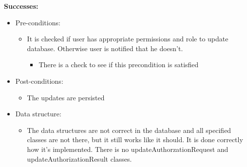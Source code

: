 \textbf{Successes:}
\begin{itemize}

	
\item Pre-conditions:
	\begin{itemize}
		\item It is checked if user has appropriate permissions and role to update database. Otherwise user is notified that he doesn't.
			\begin{itemize}
					\item There is a check to see if this precondition is satisfied
			\end{itemize}
	\end{itemize}
		
	\item Post-conditions:
		\begin{itemize}
			\item The updates are persisted
		\end{itemize}
		
	\item Data structure:
		\begin{itemize}
			\item The data structures are not correct in the database and all specified classes are not there, but it still works like it should. It is done correctly how it's implemented. There is no updateAuthorzationRequest and updateAuthorizationResult classes. 
		\end{itemize}
\end{itemize}

\noindent
\medskip

